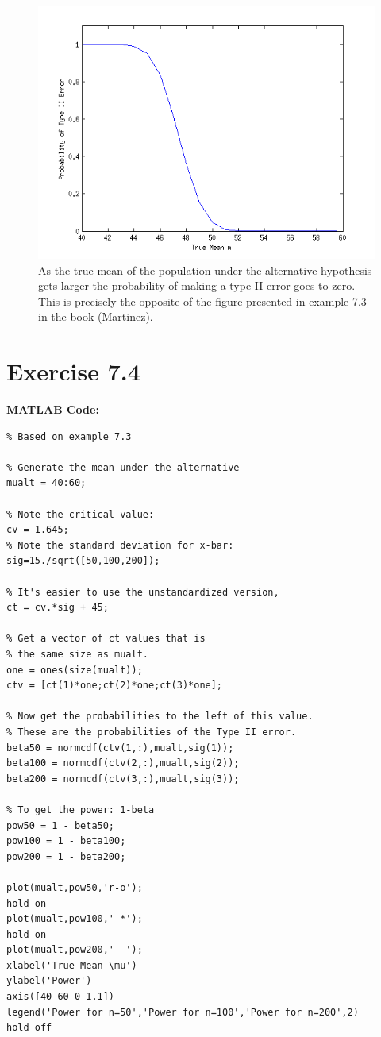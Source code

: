 \documentclass[12pt,a4paper]{article}
\begin{document}
\begin{figure}[ht!]
\begin{center}
\includegraphics[scale=.75]{q7p2_graph.png}
\caption{As the true mean of the population under the alternative hypothesis gets larger the probability of making a type II error goes to zero. This is precisely the opposite of the figure presented in example 7.3 in the book (Martinez).}
\label{q7p2 fig1}
\end{center}
\end{figure}
\FloatBarrier

\section*{Exercise 7.4}

\textbf{MATLAB Code:}

\begin{verbatim}
% Based on example 7.3

% Generate the mean under the alternative
mualt = 40:60;

% Note the critical value:
cv = 1.645;
% Note the standard deviation for x-bar:
sig=15./sqrt([50,100,200]);

% It's easier to use the unstandardized version, 
ct = cv.*sig + 45;

% Get a vector of ct values that is 
% the same size as mualt.
one = ones(size(mualt));
ctv = [ct(1)*one;ct(2)*one;ct(3)*one];

% Now get the probabilities to the left of this value.
% These are the probabilities of the Type II error.
beta50 = normcdf(ctv(1,:),mualt,sig(1));
beta100 = normcdf(ctv(2,:),mualt,sig(2));
beta200 = normcdf(ctv(3,:),mualt,sig(3));

% To get the power: 1-beta
pow50 = 1 - beta50;
pow100 = 1 - beta100;
pow200 = 1 - beta200;

plot(mualt,pow50,'r-o');
hold on
plot(mualt,pow100,'-*');
hold on
plot(mualt,pow200,'--');
xlabel('True Mean \mu')
ylabel('Power')
axis([40 60 0 1.1])
legend('Power for n=50','Power for n=100','Power for n=200',2)
hold off

\end{verbatim}
\end{document}
